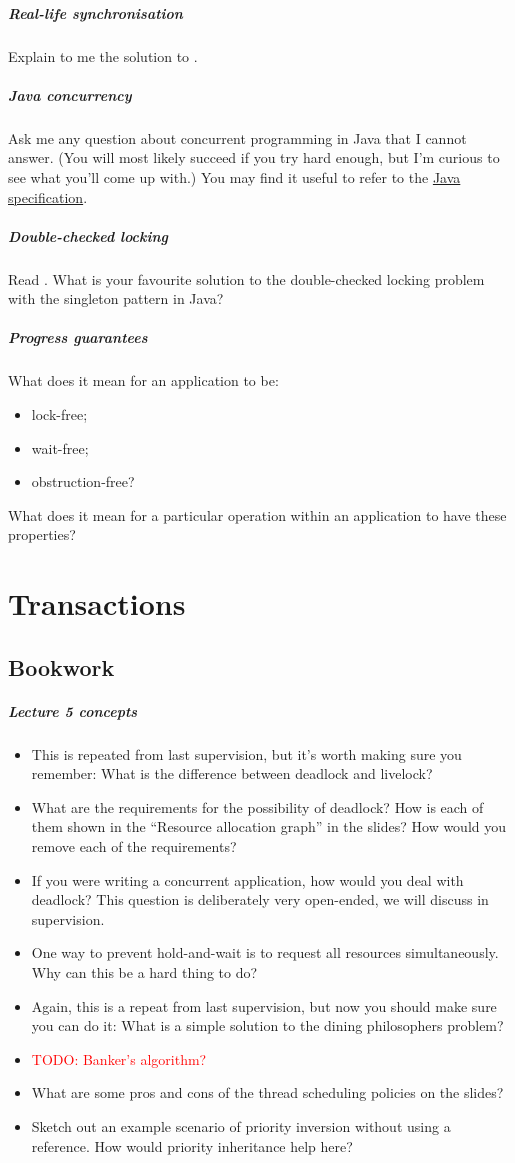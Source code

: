 \documentclass[12pt,a4paper,oneside,openright]{report}
\newcommand{\question}[2]{\paragraph{#1} #2}
\newcommand{\todo}[1]{\textcolor{red}{TODO: #1}}
\begin{document}
\question{Real-life synchronisation}{Explain to me the solution to
  \cite[Chapter~1,~Exercise~4]{ArtMultiprocessorProgramming}.}

\question{Java concurrency}{Ask me any question about concurrent
  programming in Java that I cannot answer. (You will most likely
  succeed if you try hard enough, but I'm curious to see what you'll
  come up with.) You may find it useful to refer to the
  \href{https://docs.oracle.com/javase/specs/jls/se15/html/jls-17.html}{Java
    specification}.}

\question{Double-checked locking}{Read \cite{DCL}. What is your
  favourite solution to the double-checked locking problem with the
  singleton pattern in Java?}

\question{Progress guarantees}{What does it mean for an application to
  be:
  \begin{itemize}
  \item lock-free;
  \item wait-free;
  \item obstruction-free?
  \end{itemize}
  What does it mean for a particular operation within an application
  to have these properties?  }

\chapter{Transactions}

\section{Bookwork}

\question{Lecture 5 concepts}{
  \begin{itemize}
  \item This is repeated from last supervision, but it's worth making
    sure you remember: What is the difference between deadlock and
    livelock?
  \item What are the requirements for the possibility of deadlock? How
    is each of them shown in the ``Resource allocation graph'' in the
    slides? How would you remove each of the requirements?
  \item If you were writing a concurrent application, how would you
    deal with deadlock? This question is deliberately very open-ended,
    we will discuss in supervision.
  \item One way to prevent hold-and-wait is to request all resources
    simultaneously. Why can this be a hard thing to do?
  \item Again, this is a repeat from last supervision, but now you
    should make sure you can do it: What is a simple solution to the
    dining philosophers problem?
  \item \todo{Banker's algorithm?}
  \item What are some pros and cons of the thread scheduling policies
    on the slides?
  \item Sketch out an example scenario of priority inversion without
    using a reference. How would priority inheritance help here?
  \end{itemize}
}
\end{document}
